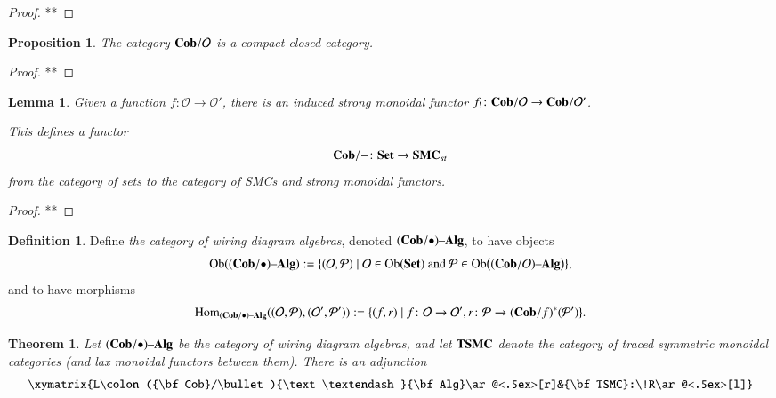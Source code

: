 \documentclass{amsart}
\def\tn{\textnormal}
\def\mc{\mathcal}
\def\Hom{\tn{Hom}}
\def\Ob{\tn{Ob}}
\def\to{\rightarrow}
\def\taking{\colon}
\def\|{{\;|\;}}
\def\Cob{{\bf Cob}}
\def\Set{{\bf Set}}
\def\alg{{\text \textendash}{\bf Alg}}
\def\mcO{\mc{O}}
\def\mcP{\mc{P}}
\def\SMC{{\bf SMC}}
\def\TSMC{{\bf TSMC}}
\newtheorem{theorem}[subsubsection]{Theorem}
\newtheorem{lemma}[subsubsection]{Lemma}
\newtheorem{proposition}[subsubsection]{Proposition}
\theoremstyle{remark}
\theoremstyle{definition}
\newtheorem{definition}[subsubsection]{Definition}
\begin{document}
\begin{proof}

**

\end{proof}

\begin{proposition}

The category $\Cob/\mcO$ is a compact closed category. 

\end{proposition}

\begin{proof}

**

\end{proof}


\begin{lemma}

Given a function $f\taking\mcO\to\mcO'$, there is an induced strong monoidal functor $f_!\taking\Cob/\mcO\to\Cob/\mcO'$.

This defines a functor 
$$\Cob/-\taking\Set\to\SMC_{st}$$
from the category of sets to the category of SMCs and strong monoidal functors.

\end{lemma}

\begin{proof}

**

\end{proof}

\begin{definition}

Define {\em the category of wiring diagram algebras}, denoted $(\Cob/\bullet)\alg$, to have objects 
$$\Ob((\Cob/\bullet)\alg):=\{(\mcO,\mcP)\|\mcO\in\Ob(\Set)\tn{ and } \mcP\in\Ob\big((\Cob/\mcO)\alg\big)\},$$
and to have morphisms
$$\Hom_{(\Cob/\bullet)\alg}((\mcO,\mcP),(\mcO',\mcP')):=\{(f,r)\|f\taking\mcO\to\mcO', r\taking\mcP\to(\Cob/f)^*(\mcP')\}.$$

\end{definition}

\begin{theorem}

Let $(\Cob/\bullet)\alg$ be the category of wiring diagram algebras, and let $\TSMC$ denote the category of traced symmetric monoidal categories (and lax monoidal functors between them). There is an adjunction
$$\xymatrix{L\taking(\Cob/\bullet)\alg\ar@<.5ex>[r]&\TSMC:\!R\ar@<.5ex>[l]}$$

\end{theorem}
\end{document}
